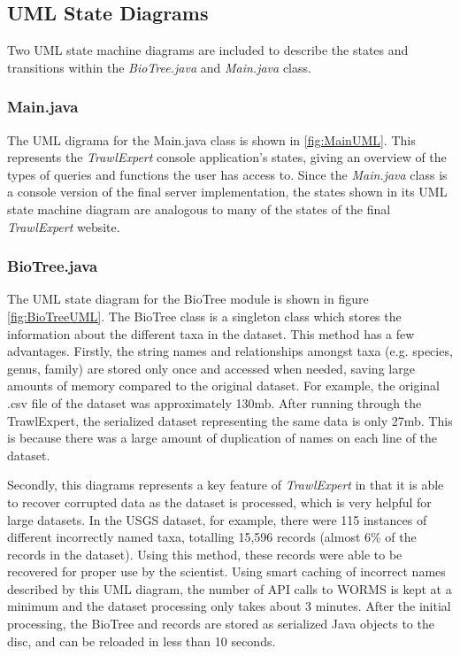 \documentclass{article}
\begin{document}
\subsection{UML State Diagrams}
Two UML state machine diagrams are included to describe the states and transitions within the \textit{BioTree.java} and \textit{Main.java} class.

\subsubsection{Main.java}
The UML digrama for the Main.java class is shown in \ref{fig:MainUML}. This represents the \textit{TrawlExpert} console application's states, giving an overview of the types of queries and functions the user has access to. Since the \textit{Main.java} class is a console version of the final server implementation, the states shown in its UML state machine diagram are analogous to many of the states of the final \textit{TrawlExpert} website.
 
\subsubsection{BioTree.java}
The UML state diagram for the BioTree module is shown in figure \ref{fig:BioTreeUML}. The BioTree class is a singleton class which stores the information about the different taxa in the dataset. This method has a few advantages. Firstly, the string names and relationships amongst taxa (e.g. species, genus, family) are stored only once and accessed when needed, saving large amounts of memory compared to the original dataset. For example, the original .csv file of the dataset was approximately 130mb. After running through the TrawlExpert, the serialized dataset representing the same data is only 27mb. This is because there was a large amount of duplication of names on each line of the dataset.

Secondly, this diagrams represents a key feature of \textit{TrawlExpert} in that it is able to recover corrupted data as the dataset is processed, which is very helpful for large datasets. In the USGS dataset, for example, there were 115 instances of different incorrectly named taxa, totalling 15,596 records (almost 6\% of the records in the dataset). Using this method, these records were able to be recovered for proper use by the scientist. Using smart caching of incorrect names described by this UML diagram, the number of API calls to WORMS is kept at a minimum and the dataset processing only takes about 3 minutes. After the initial processing, the BioTree and records are stored as serialized Java objects to the disc, and can be reloaded in less than 10 seconds.
\end{document}
